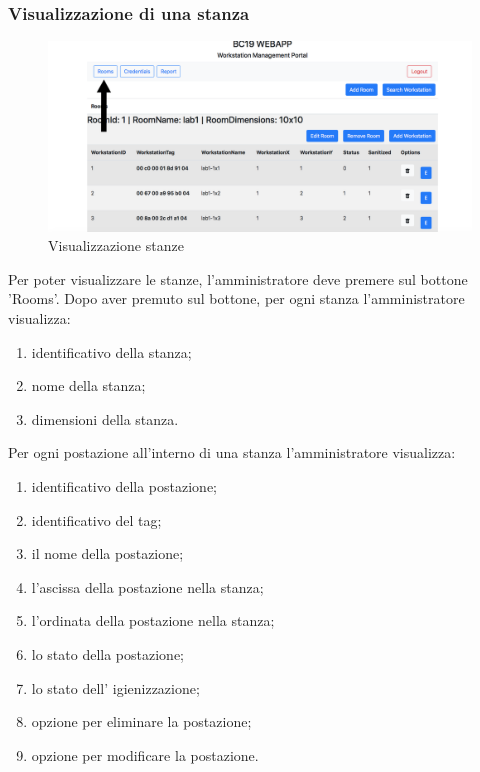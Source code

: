 \subsubsection{Visualizzazione di una stanza}
\begin{figure}[H]
	\centering
	\includegraphics[width=15cm]{res/images/visStanza.png}
	\caption{Visualizzazione stanze}
\end{figure}
Per poter visualizzare le stanze, l'amministratore deve premere sul bottone 'Rooms'.
Dopo aver premuto sul bottone, per ogni stanza l'amministratore visualizza:
\begin{enumerate}
	\item identificativo della stanza;
	\item nome della stanza;
	\item dimensioni della stanza.
\end{enumerate}
Per ogni postazione all'interno di una stanza l'amministratore visualizza:
\begin{enumerate}
	\item identificativo della postazione;
	\item identificativo del tag;
	\item il nome della postazione;
	\item l'ascissa della postazione nella stanza;
	\item l'ordinata della postazione nella stanza;
	\item lo stato della postazione;
	\item lo stato dell' igienizzazione;
	\item opzione per eliminare la postazione;
	\item opzione per modificare la postazione.
	
\end{enumerate}

